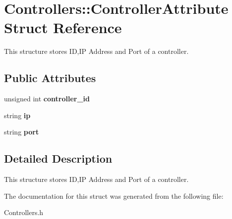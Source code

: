 \hypertarget{structControllers_1_1ControllerAttribute}{\section{\-Controllers\-:\-:\-Controller\-Attribute \-Struct \-Reference}
\label{structControllers_1_1ControllerAttribute}
}


\-This structure stores \-I\-D,\-I\-P \-Address and \-Port of a controller.  


\subsection*{\-Public \-Attributes}
\begin{DoxyCompactItemize}
\item 
\hypertarget{structControllers_1_1ControllerAttribute_af64bb7210790352007d546d948070f26}{unsigned int {\bfseries controller\-\_\-id}}\label{structControllers_1_1ControllerAttribute_af64bb7210790352007d546d948070f26}

\item 
\hypertarget{structControllers_1_1ControllerAttribute_a23e6f933d533be9c4d1266fe959646c2}{string {\bfseries ip}}\label{structControllers_1_1ControllerAttribute_a23e6f933d533be9c4d1266fe959646c2}

\item 
\hypertarget{structControllers_1_1ControllerAttribute_a9ea6be14cedc75e1232c6e4027c55660}{string {\bfseries port}}\label{structControllers_1_1ControllerAttribute_a9ea6be14cedc75e1232c6e4027c55660}

\end{DoxyCompactItemize}


\subsection{\-Detailed \-Description}
\-This structure stores \-I\-D,\-I\-P \-Address and \-Port of a controller. 

\-The documentation for this struct was generated from the following file\-:\begin{DoxyCompactItemize}
\item 
\-Controllers.\-h\end{DoxyCompactItemize}
